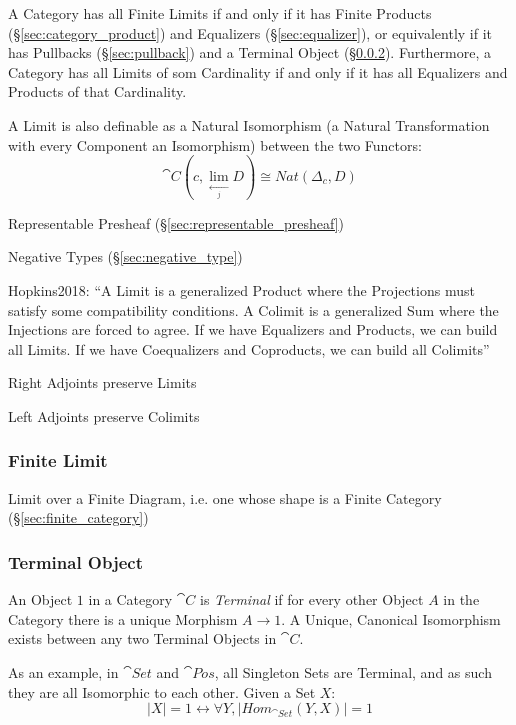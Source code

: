 A Category has all Finite Limits if and only if it has Finite Products
(\S\ref{sec:category_product}) and Equalizers (\S\ref{sec:equalizer}),
or equivalently if it has Pullbacks (\S\ref{sec:pullback}) and a
Terminal Object (\S\ref{sec:terminal_object}). Furthermore, a Category
has all Limits of som Cardinality if and only if it has all Equalizers
and Products of that Cardinality. \cite{awodey06}

A Limit is also definable as a Natural Isomorphism (a Natural
Transformation with every Component an Isomorphism) between the two
Functors:
\[
  \cat{C}(c, \lim_{\xleftarrow[j]{}} D) \cong Nat (\Delta_c, D)
\]

Representable Presheaf (\S\ref{sec:representable_presheaf})

Negative Types (\S\ref{sec:negative_type})


Hopkins2018: ``A Limit is a generalized Product where the Projections must
satisfy some compatibility conditions. A Colimit is a generalized Sum where the
Injections are forced to agree. If we have Equalizers and Products, we can
build all Limits. If we have Coequalizers and Coproducts, we can build all
Colimits''

Right Adjoints preserve Limits

Left Adjoints preserve Colimits



\subsubsection{Finite Limit}\label{sec:finite_limit}

Limit over a Finite Diagram, i.e. one whose shape is a Finite Category
(\S\ref{sec:finite_category})



\subsubsection{Terminal Object}\label{sec:terminal_object}

An Object $1$ in a Category $\cat{C}$ is \emph{Terminal} if for
every other Object $A$ in the Category there is a unique Morphism $A
\rightarrow 1$. A Unique, Canonical Isomorphism exists between any two
Terminal Objects in $\cat{C}$.

As an example, in $\cat{Set}$ and $\cat{Pos}$, all Singleton
Sets are Terminal, and as such they are all Isomorphic to each other.
Given a Set $X$:
\[
  |X| = 1 \leftrightarrow \forall Y, |Hom_{\cat{Set}}(Y,X)| = 1
\]

